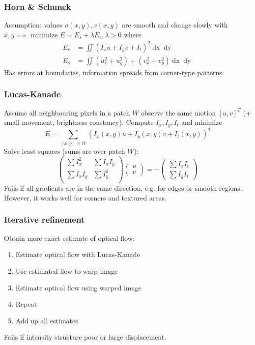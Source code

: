 \documentclass[a4paper,10pt]{article}
\begin{document}
\subsubsection{Horn \& Schunck}
Assumption: values \(u(x, y), v(x, y)\) are smooth and change slowly with \(x, y \implies\) minimize \(E = E_s + \lambda E_c, \lambda > 0\) where 
\begin{align*}
	E_c &= \iint (I_x u + I_y v + I_t)^2 \mathop{dx} \mathop{dy} \tag{brightness const.} \\ 
	E_s &= \iint (u^2_x + u^2_y) + (v^2_x + v^2_y) \mathop{dx} \mathop{dy} \tag{smoothness}
\end{align*}
Has errors at boundaries, information spreads from corner-type patterns

\subsubsection{Lucas-Kanade}
Assume all neighbouring pixels in a patch \(W\) observe the same motion \(\left[u, v\right]^T\) (+ small movement, brightness constancy). Compute \(I_x, I_y, I_t\) and minimize
\[E = \sum_{(x, y) \in W} (I_x(x, y)u + I_y(x, y)v + I_t(x, y))^2\]
Solve least squares (sums are over patch \(W\)):
\[
    \begin{pmatrix} 
        \sum I^2_x & \sum I_x I_y \\
    \sum I_x I_y & \sum I^2_y \\
    \end{pmatrix}
    \begin{pmatrix}
		u \\
        v
    \end{pmatrix}
	= -
	\begin{pmatrix}
	    \sum I_x I_t \\
	    \sum I_y I_t
	\end{pmatrix}
\] 
Fails if all gradients are in the same direction, e.g. for edges or smooth regions. However, it works well for corners and textured areas.

\subsubsection{Iterative refinement}
Obtain more exact estimate of optical flow:
\begin{enumerate}
	\item Estimate optical flow with Lucas-Kanade
	\item Use estimated flow to warp image
	\item Estimate optical flow using warped image
	\item Repeat
	\item Add up all estimates
\end{enumerate}
Fails if intensity structure poor or large displacement.
\end{document}
